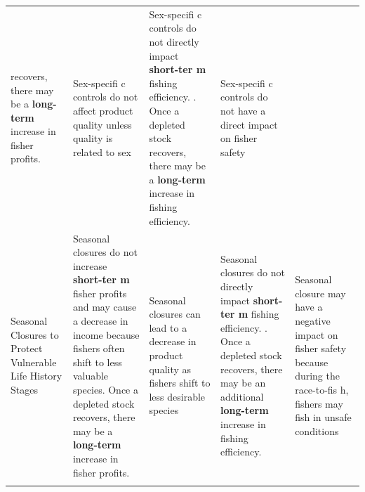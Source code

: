 \documentclass[]{book}
\begin{document}
\begin{longtable}[]{@{}lllll@{}}
\begin{minipage}[t]{0.17\columnwidth}
recovers, there may be a \textbf{long-term } increase in fisher
profits.\strut
\end{minipage} & \begin{minipage}[t]{0.17\columnwidth}\raggedright\strut
Sex-specifi c controls do not affect product quality unless quality is
related to sex\strut
\end{minipage} & \begin{minipage}[t]{0.17\columnwidth}\raggedright\strut
Sex-specifi c controls do not directly impact \textbf{short-ter m}
fishing efficiency. . Once a depleted stock recovers, there may be a
\textbf{long-term } increase in fishing efficiency.\strut
\end{minipage} & \begin{minipage}[t]{0.17\columnwidth}\raggedright\strut
Sex-specifi c controls do not have a direct impact on fisher
safety\strut
\end{minipage}\tabularnewline
\begin{minipage}[t]{0.17\columnwidth}\raggedright\strut
Seasonal Closures to Protect Vulnerable Life History Stages\strut
\end{minipage} & \begin{minipage}[t]{0.17\columnwidth}\raggedright\strut
Seasonal closures do not increase \textbf{short-ter m} fisher profits
and may cause a decrease in income because fishers often shift to less
valuable species. Once a depleted stock recovers, there may be a
\textbf{long-term } increase in fisher profits.\strut
\end{minipage} & \begin{minipage}[t]{0.17\columnwidth}\raggedright\strut
Seasonal closures can lead to a decrease in product quality as fishers
shift to less desirable species\strut
\end{minipage} & \begin{minipage}[t]{0.17\columnwidth}\raggedright\strut
Seasonal closures do not directly impact \textbf{short-ter m} fishing
efficiency. . Once a depleted stock recovers, there may be an additional
\textbf{long-term } increase in fishing efficiency.\strut
\end{minipage} & \begin{minipage}[t]{0.17\columnwidth}\raggedright\strut
Seasonal closure may have a negative impact on fisher safety because
during the race-to-fis h, fishers may fish in unsafe conditions\strut
\end{minipage}\tabularnewline
\begin{minipage}[t]{0.17\columnwidth}\raggedright\strut

\end{minipage}
\end{longtable}
\end{document}
